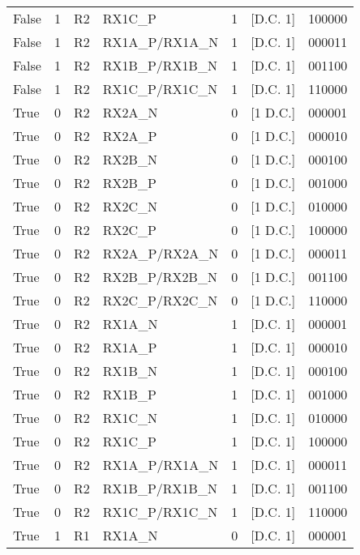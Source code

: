 \documentclass{article}
\begin{document}
\begin{landscape}
\begin{scriptsize}
\begin{longtable}{|p{4.5cm}|p{3.5cm}|p{1.5cm}|p{3.5cm}|p{1.75cm}|p{2.1cm}|p{2cm}|}
		False & 1 & R2\footref{r2} & RX1C\_P         & 1 & [D.C. 1] & 100000 \\
		False & 1 & R2\footref{r2} & RX1A\_P/RX1A\_N & 1 & [D.C. 1] & 000011 \\
		False & 1 & R2\footref{r2} & RX1B\_P/RX1B\_N & 1 & [D.C. 1] & 001100 \\
		False & 1 & R2\footref{r2} & RX1C\_P/RX1C\_N & 1 & [D.C. 1] & 110000 \\
		\hline
		True & 0 & R2\footref{r2} & RX2A\_N         & 0 & [1 D.C.]  & 000001 \\
		True & 0 & R2\footref{r2} & RX2A\_P         & 0 & [1 D.C.]  & 000010 \\
		True & 0 & R2\footref{r2} & RX2B\_N         & 0 & [1 D.C.]  & 000100 \\
		True & 0 & R2\footref{r2} & RX2B\_P         & 0 & [1 D.C.]  & 001000 \\
		True & 0 & R2\footref{r2} & RX2C\_N         & 0 & [1 D.C.]  & 010000 \\
		True & 0 & R2\footref{r2} & RX2C\_P         & 0 & [1 D.C.]  & 100000 \\
		True & 0 & R2\footref{r2} & RX2A\_P/RX2A\_N & 0 & [1 D.C.]  & 000011 \\
		True & 0 & R2\footref{r2} & RX2B\_P/RX2B\_N & 0 & [1 D.C.]  & 001100 \\
		True & 0 & R2\footref{r2} & RX2C\_P/RX2C\_N & 0 & [1 D.C.]  & 110000 \\
		\hline
		True & 0 & R2\footref{r2} & RX1A\_N         & 1 & [D.C. 1] & 000001 \\
		True & 0 & R2\footref{r2} & RX1A\_P         & 1 & [D.C. 1] & 000010 \\
		True & 0 & R2\footref{r2} & RX1B\_N         & 1 & [D.C. 1] & 000100 \\
		True & 0 & R2\footref{r2} & RX1B\_P         & 1 & [D.C. 1] & 001000 \\
		True & 0 & R2\footref{r2} & RX1C\_N         & 1 & [D.C. 1] & 010000 \\
		True & 0 & R2\footref{r2} & RX1C\_P         & 1 & [D.C. 1] & 100000 \\
		True & 0 & R2\footref{r2} & RX1A\_P/RX1A\_N & 1 & [D.C. 1] & 000011 \\
		True & 0 & R2\footref{r2} & RX1B\_P/RX1B\_N & 1 & [D.C. 1] & 001100 \\
		True & 0 & R2\footref{r2} & RX1C\_P/RX1C\_N & 1 & [D.C. 1] & 110000 \\
		\hline
		True & 1 & R1 & RX1A\_N         & 0 & [D.C. 1]  & 000001 \\

\end{longtable}
\end{scriptsize}
\end{landscape}
\end{document}
